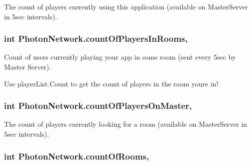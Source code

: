 The count of players currently using this application (available on Master\+Server in 5sec intervals). 

\subsubsection[{\texorpdfstring{count\+Of\+Players\+In\+Rooms}{countOfPlayersInRooms}}]{\setlength{\rightskip}{0pt plus 5cm}int Photon\+Network.\+count\+Of\+Players\+In\+Rooms\hspace{0.3cm}{\ttfamily [static]}, {\ttfamily [get]}}\hypertarget{class_photon_network_a8830a7a4b92490f7882780630b1fcf99}{}\label{class_photon_network_a8830a7a4b92490f7882780630b1fcf99}


Count of users currently playing your app in some room (sent every 5sec by Master Server). 

Use player\+List.\+Count to get the count of players in the room you\textquotesingle{}re in! 
\subsubsection[{\texorpdfstring{count\+Of\+Players\+On\+Master}{countOfPlayersOnMaster}}]{\setlength{\rightskip}{0pt plus 5cm}int Photon\+Network.\+count\+Of\+Players\+On\+Master\hspace{0.3cm}{\ttfamily [static]}, {\ttfamily [get]}}\hypertarget{class_photon_network_a1e23b1e0ff44046e6532c8588ac08140}{}\label{class_photon_network_a1e23b1e0ff44046e6532c8588ac08140}


The count of players currently looking for a room (available on Master\+Server in 5sec intervals). 

\subsubsection[{\texorpdfstring{count\+Of\+Rooms}{countOfRooms}}]{\setlength{\rightskip}{0pt plus 5cm}int Photon\+Network.\+count\+Of\+Rooms\hspace{0.3cm}{\ttfamily [static]}, {\ttfamily [get]}}\hypertarget{class_photon_network_a6cbf85644c07b9ceb4b4a1accd0f4ce9}{}\label{class_photon_network_a6cbf85644c07b9ceb4b4a1accd0f4ce9}



